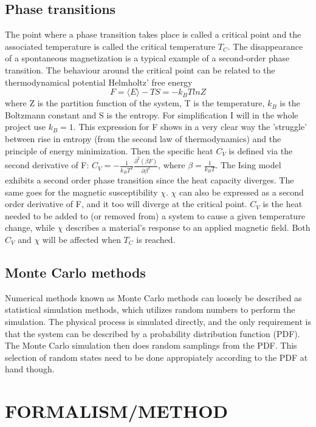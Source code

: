 \documentclass[twocolumn]{article}
\begin{document}
\subsection{Phase transitions}
The point where a phase transition takes place is called a critical point and the associated temperature is called the critical temperature $T_C$. The disappearance of a spontaneous magnetization is a typical example of a second-order phase transition. The behaviour around the critical point can be related to the thermodynamical potential Helmholtz' free energy
\begin{equation}
    F = \langle E \rangle - TS = - k_B TlnZ
\end{equation}
where Z is the partition function of the system, T is the temperature, $k_B$ is the Boltzmann constant and S is the entropy. For simplification I will in the whole project use $k_B = 1$. This expression for F shows in a very clear way the 'struggle' between rise in entropy (from the second law of thermodynamics) and the principle of energy minimization.\newline
Then the specific heat $C_V$ is defined via the second derivative of F: $C_V = - \frac{1}{k_B T^2}\frac{\partial^2(\beta F)}{\partial \beta ^2}$, where $\beta = \frac{1}{k_B T}$. The Ising model exhibits a second order phase transition since the heat capacity diverges. The same goes for the magnetic susceptibility $\chi$. $\chi$ can also be expressed as a second order derivative of F, and it too will diverge at the critical point.\newline
$C_V$ is the heat needed to be added to (or removed from) a system to cause a given temperature change, while $\chi$ describes a material's response to an applied magnetic field. Both $C_V$ and $\chi$ will be affected when $T_C$ is reached.

\subsection{Monte Carlo methods}
Numerical methods known as Monte Carlo methods can loosely be described as statistical simulation methods, which utilizes random numbers to perform the simulation. The physical process is simulated directly, and the only requirement is that the system can be described by a probability distribution function (PDF). The Monte Carlo simulation then does random samplings from the PDF. This selection of random states need to be done appropiately according to the PDF at hand though.

\section{FORMALISM/METHOD}
\end{document}
